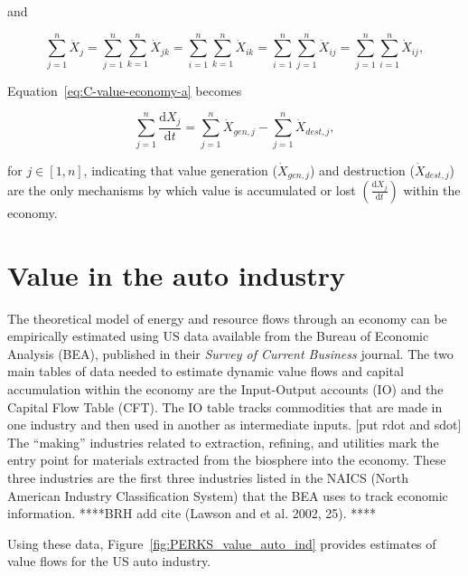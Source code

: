\noindent{}and

\begin{equation} \label{eq:X_identity_2}
	\sum\limits_{j=1}^n\dot{X}_{j}  
	= \sum\limits_{j=1}^n \sum\limits_{k=1}^n \dot{X}_{jk}
	= \sum\limits_{i=1}^n \sum\limits_{k=1}^n \dot{X}_{ik}
	= \sum\limits_{i=1}^n \sum\limits_{j=1}^n \dot{X}_{ij}
	= \sum\limits_{j=1}^n \sum\limits_{i=1}^n \dot{X}_{ij},
\end{equation}

\noindent{}Equation~\ref{eq:C-value-economy-a} becomes

\begin{equation}\label{eq:C-value-economy-b}
	\sum\limits_{j=1}^{n} \frac{\mathrm{d}X_{j}}{\mathrm{d}t}
	= \sum\limits_{j=1}^{n} \dot{X}_{gen,j}
	- \sum\limits_{j=1}^{n} \dot{X}_{dest,j},
\end{equation}

\noindent{}for $j \in [1, n]$, indicating that 
value generation ($\dot{X}_{gen,j}$) 
and destruction ($\dot{X}_{dest,j}$)
are the only mechanisms by which value is accumulated or lost
$\left( \frac{\mathrm{d}X_{j}}{\mathrm{d}t} \right)$
within the economy.


\section{Value in the auto industry}
\label{sec:value_auto}
The theoretical model of energy and resource flows through an economy can be empirically estimated using US data available 
from the Bureau of Economic Analysis (BEA), published in their \emph{Survey of Current Business} journal.
 The two main tables of data needed to estimate dynamic value flows and capital accumulation within the economy 
are the Input-Output accounts (IO) and the Capital Flow Table (CFT). 
 The IO table tracks commodities that are made in one industry and then used in another as intermediate inputs. [put rdot and sdot]
The “making” industries related to extraction, refining, and utilities 
mark the entry point for materials extracted from the biosphere into the economy. 
 These three industries are the first three industries listed in the NAICS (North American Industry Classification System)
 that the BEA uses to track economic information. 
****BRH  add cite (Lawson and et al. 2002, 25). **** 

Using these data, Figure~\ref{fig:PERKS_value_auto_ind} provides estimates 
of value flows for the US auto industry.

